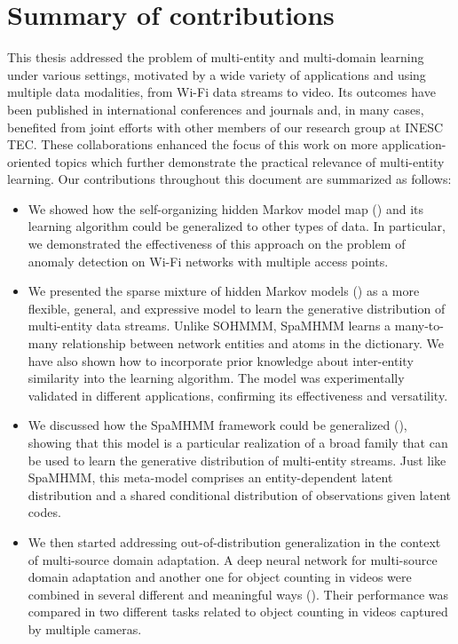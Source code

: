 \section{Summary of contributions}
This thesis addressed the problem of multi-entity and multi-domain learning under various settings, motivated by a wide variety of applications and using multiple data modalities, from Wi-Fi data streams to video. Its outcomes have been published in international conferences and journals and, in many cases, benefited from joint efforts with other members of our research group at INESC TEC. These collaborations enhanced the focus of this work on more application-oriented topics which further demonstrate the practical relevance of multi-entity learning. Our contributions throughout this document are summarized as follows:
\begin{itemize}
    \item We showed how the self-organizing hidden Markov model map () and its learning algorithm could be generalized to other types of data. In particular, we demonstrated the effectiveness of this approach on the problem of anomaly detection on Wi-Fi networks with multiple access points.
    \item We presented the sparse mixture of hidden Markov models () as a more flexible, general, and expressive model to learn the generative distribution of multi-entity data streams. Unlike SOHMMM, SpaMHMM learns a many-to-many relationship between network entities and atoms in the dictionary. We have also shown how to incorporate prior knowledge about inter-entity similarity into the learning algorithm. The model was experimentally validated in different applications, confirming its effectiveness and versatility.
    \item We discussed how the SpaMHMM framework could be generalized (), showing that this model is a particular realization of a broad family that can be used to learn the generative distribution of multi-entity streams. Just like SpaMHMM, this meta-model comprises an entity-dependent latent distribution and a shared conditional distribution of observations given latent codes.
    \item We then started addressing out-of-distribution generalization in the context of multi-source domain adaptation. A deep neural network for multi-source domain adaptation and another one for object counting in videos were combined in several different and meaningful ways (). Their performance was compared in two different tasks related to object counting in videos captured by multiple cameras.

\end{itemize}
